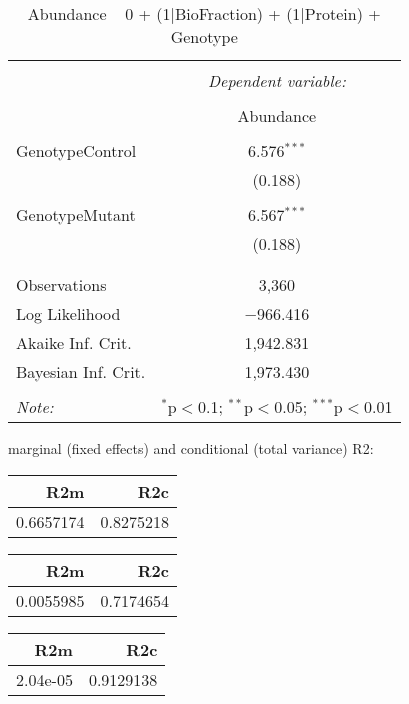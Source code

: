 \documentclass[11pt]{report}
\begin{document}
\begin{table}[!htbp] \centering 
  \caption{Abundance ~ 0 + (1|BioFraction) + (1|Protein) + Genotype} 
  \label{} 
\begin{tabular}{@{\extracolsep{5pt}}lc} 
\\[-1.8ex]\hline 
\hline \\[-1.8ex] 
 & \multicolumn{1}{c}{\textit{Dependent variable:}} \\ 
\cline{2-2} 
\\[-1.8ex] & Abundance \\ 
\hline \\[-1.8ex] 
 GenotypeControl & 6.576$^{***}$ \\ 
  & (0.188) \\ 
  & \\ 
 GenotypeMutant & 6.567$^{***}$ \\ 
  & (0.188) \\ 
  & \\ 
\hline \\[-1.8ex] 
Observations & 3,360 \\ 
Log Likelihood & $-$966.416 \\ 
Akaike Inf. Crit. & 1,942.831 \\ 
Bayesian Inf. Crit. & 1,973.430 \\ 
\hline 
\hline \\[-1.8ex] 
\textit{Note:}  & \multicolumn{1}{r}{$^{*}$p$<$0.1; $^{**}$p$<$0.05; $^{***}$p$<$0.01} \\ 
\end{tabular} 
\end{table} 
marginal (fixed effects) and conditional (total variance) R2:

\begin{tabular}{r|r}
\hline
R2m & R2c\\
\hline
0.6657174 & 0.8275218\\
\hline
\end{tabular}

\begin{tabular}{r|r}
\hline
R2m & R2c\\
\hline
0.0055985 & 0.7174654\\
\hline
\end{tabular}

\begin{tabular}{r|r}
\hline
R2m & R2c\\
\hline
2.04e-05 & 0.9129138\\
\hline
\end{tabular}
\end{document}
